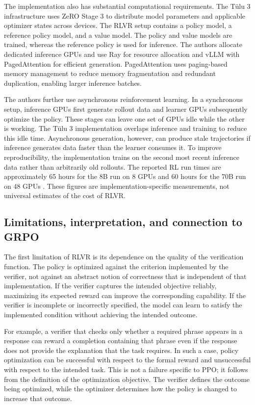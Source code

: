 The implementation also has substantial computational requirements.
The Tülu 3 infrastructure uses ZeRO Stage 3 to distribute model parameters
and applicable optimizer states across devices. The RLVR setup contains a
policy model, a reference policy model, and a value model. The policy and
value models are trained, whereas the reference policy is used for
inference. The authors allocate dedicated inference GPUs and use Ray for
resource allocation and vLLM with PagedAttention for efficient generation.
PagedAttention uses paging-based memory management to reduce memory
fragmentation and redundant duplication, enabling larger inference batches.

The authors further use asynchronous reinforcement learning. In a
synchronous setup, inference GPUs first generate rollout data and learner
GPUs subsequently optimize the policy. These stages can leave one set of
GPUs idle while the other is working. The Tülu 3 implementation overlaps
inference and training to reduce this idle time. Asynchronous generation,
however, can produce stale trajectories if inference generates data faster
than the learner consumes it. To improve reproducibility, the implementation
trains on the second most recent inference data rather than arbitrarily old
rollouts. The reported RL run times are approximately 65 hours for the 8B
run on 8 GPUs and 60 hours for the 70B run on 48 GPUs
\parencite{lambert2025tulu3}. These figures are implementation-specific
measurements, not universal estimates of the cost of RLVR.

\subsection{Limitations, interpretation, and connection to GRPO}
\label{subsec:rlvr-limitations-transition}

The first limitation of RLVR is its dependence on the quality of the
verification function. The policy is optimized against the criterion
implemented by the verifier, not against an abstract notion of correctness
that is independent of that implementation. If the verifier captures the
intended objective reliably, maximizing its expected reward can improve the
corresponding capability. If the verifier is incomplete or incorrectly
specified, the model can learn to satisfy the implemented condition without
achieving the intended outcome.

For example, a verifier that checks only whether a required phrase appears
in a response can reward a completion containing that phrase even if the
response does not provide the explanation that the task requires. In such
a case, policy optimization can be successful with respect to the formal
reward and unsuccessful with respect to the intended task. This is not a
failure specific to PPO; it follows from the definition of the optimization
objective. The verifier defines the outcome being optimized, while the
optimizer determines how the policy is changed to increase that outcome.

